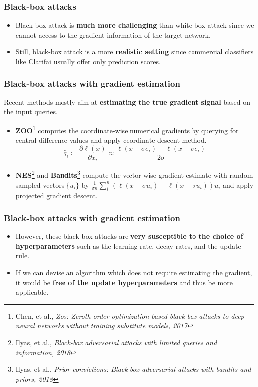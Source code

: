 \documentclass[10pt,mathserif]{beamer}
\begin{document}
\begin{frame}
    \frametitle{Black-box attacks}
    \begin{itemize}\itemsep=12pt
        \item Black-box attack is \textbf{much more challenging} than white-box attack since we cannot access to the gradient information of the target network.\pause
        \item Still, black-box attack is a more \textbf{realistic setting} since commercial classifiers like Clarifai usually offer only prediction scores.
    \end{itemize}
    
\end{frame}

\begin{frame}
\frametitle{Black-box attacks with gradient estimation}
Recent methods mostly aim at \textbf{estimating the true gradient signal} based on the input queries.\pause
\vspace{1em}
\begin{itemize}\itemsep=12pt
    \item \textbf{ZOO}\footnote{\scriptsize Chen, et al., \textit{Zoo: Zeroth order optimization based black-box attacks to deep neural networks without training substitute models, 2017}} computes the coordinate-wise numerical gradients by querying for central difference values and apply coordinate descent method.
    \[\hat g_i \coloneqq \frac{\partial \ell(x)}{\partial x_i} \approx \frac{\ell (x+\sigma e_i) - \ell (x-\sigma e_i)}{2\sigma}\] \vspace{-1.5em} \pause
    \item \textbf{NES}\footnote{\scriptsize Ilyas, et al., \textit{Black-box adversarial attacks with limited queries and information, 2018}} and \textbf{Bandits}\footnote{\scriptsize Ilyas, et al., \textit{Prior convictions: Black-box adversarial attacks with bandits and priors, 2018}} compute the vector-wise gradient estimate with random sampled vectors $\{u_i\}$ by $\frac{1}{\sigma n} \sum_{i}^{n}(\ell(x+\sigma u_i)-\ell(x-\sigma u_i))u_i$ and apply projected gradient descent.
\end{itemize}
\end{frame}

\begin{frame}
\frametitle{Black-box attacks with gradient estimation}
\begin{itemize}\itemsep=12pt
        \item However, these black-box attacks are \textbf{very susceptible to the choice of hyperparameters} such as the learning rate, decay rates, and the update rule.\pause
        \item If we can devise an algorithm which does not require estimating the gradient, it would be \textbf{free of the update hyperparameters} and thus be more applicable.
\end{itemize}
\end{frame}
\end{document}
